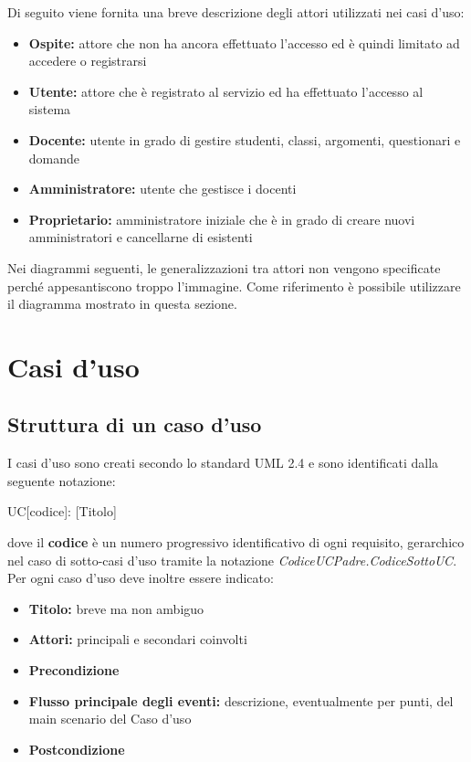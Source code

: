\documentclass[12pt,a4paper]{article}
\begin{document}
Di seguito viene fornita una breve descrizione degli attori utilizzati nei casi d'uso:

\begin{itemize}
    \item \textbf{Ospite:} attore che non ha ancora effettuato l'accesso ed è quindi limitato
        ad accedere o registrarsi
    \item \textbf{Utente:} attore che è registrato al servizio ed ha effettuato l'accesso al
        sistema
    \item \textbf{Docente:} utente in grado di gestire studenti, classi, argomenti, questionari
        e domande
    \item \textbf{Amministratore:} utente che gestisce i docenti
    \item \textbf{Proprietario:} amministratore iniziale che è in grado di creare nuovi amministratori
        e cancellarne di esistenti
\end{itemize}

Nei diagrammi seguenti, le generalizzazioni tra attori non vengono specificate perché
appesantiscono troppo l'immagine. Come riferimento è possibile utilizzare il diagramma mostrato in questa
sezione.

\newpage
\section{Casi d'uso}

\subsection{Struttura di un caso d'uso}
I casi d'uso sono creati secondo lo standard UML 2.4 e sono identificati dalla seguente notazione:
\begin{center}
	UC[codice]: [Titolo]
\end{center}
dove il \textbf{codice} è un numero progressivo identificativo di ogni requisito, gerarchico nel  caso di sotto-casi d'uso tramite la notazione \textit{CodiceUCPadre.CodiceSottoUC}. Per ogni caso d'uso deve inoltre essere indicato:
\begin{itemize}
	\item \textbf{Titolo:} breve ma non ambiguo
	\item \textbf{Attori:} principali e secondari coinvolti
	\item \textbf{Precondizione}
	\item \textbf{Flusso principale degli eventi:} descrizione, eventualmente per punti, del main scenario del Caso d'uso
	\item \textbf{Postcondizione}
\end{itemize}
\end{document}
